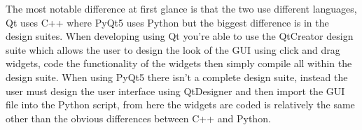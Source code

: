 The most notable difference at first glance is that the two use different languages, Qt uses C++ where PyQt5 uses Python but the biggest difference is in the design suites. When developing using Qt you're able to use the QtCreator design suite which allows the user to design the look of the GUI using click and drag widgets, code the functionality of the widgets then simply compile all within the design suite. When using PyQt5 there isn't a complete design suite, instead the user must design the user interface using QtDesigner and then import the GUI file into the Python script, from here the widgets are coded is relatively the same other than the obvious differences between C++ and Python. 




